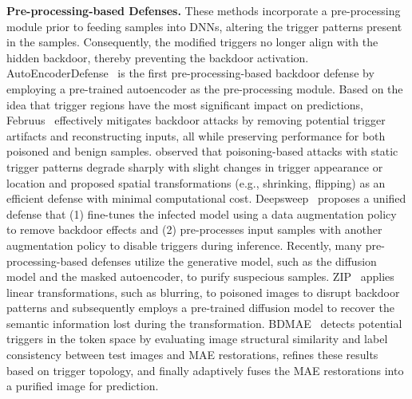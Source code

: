 \textbf{Pre-processing-based Defenses.}
These methods incorporate a pre-processing module prior to feeding samples into DNNs, altering the trigger patterns present in the samples. Consequently, the modified triggers no longer align with the hidden backdoor, thereby preventing the backdoor activation. AutoEncoderDefense~\citep{liu2017neural} is the first pre-processing-based backdoor defense by employing a pre-trained autoencoder as the pre-processing module. Based on the idea that trigger regions have the most significant impact on predictions, Februus~\citep{doan2020februus} effectively mitigates backdoor attacks by removing potential trigger artifacts and reconstructing inputs, all while preserving performance for both poisoned and benign samples. \cite{li2021backdoor} observed that poisoning-based attacks with static trigger patterns degrade sharply with slight changes in trigger appearance or location and proposed spatial transformations (e.g., shrinking, flipping) as an efficient defense with minimal computational cost. Deepsweep~\citep{qiu2021deepsweep} proposes a unified defense that (1) fine-tunes the infected model using a data augmentation policy to remove backdoor effects and (2) pre-processes input samples with another augmentation policy to disable triggers during inference. Recently, many pre-processing-based defenses utilize the generative model, such as the diffusion model and the masked autoencoder, to purify suspecious samples. ZIP~\citep{shi2023black} applies linear transformations, such as blurring, to poisoned images to disrupt backdoor patterns and subsequently employs a pre-trained diffusion model to recover the semantic information lost during the transformation. BDMAE~\citep{sun2023mask} detects potential triggers in the token space by evaluating image structural similarity and label consistency between test images and MAE restorations, refines these results based on trigger topology, and finally adaptively fuses the MAE restorations into a purified image for prediction.  

